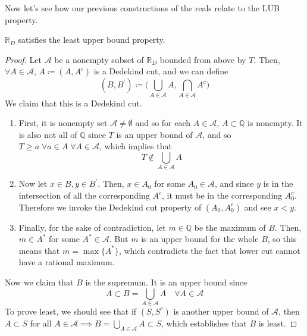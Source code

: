   Now let's see how our previous constructions of the reals relate to the LUB property. 

  \begin{theorem}
    $\mathbb{R}_D$ satisfies the least upper bound property. 
  \end{theorem}
  \begin{proof}
    Let $\mathcal{A}$ be a nonempty subset of $\mathbb{R}_D$ bounded from above by $T$. Then, $\forall A \in \mathcal{A}$, $A \coloneqq (A, A^c)$ is a Dedekind cut, and we can define
    \begin{equation}
      (B, B^\prime) \coloneqq \bigg( \bigcup_{A \in \mathcal{A}} A, \bigcap_{A \in \mathcal{A}} A^c \bigg)
    \end{equation} 
    We claim that this is a Dedekind cut. 
    \begin{enumerate}
      \item First, it is nonempty set $\mathcal{A} \neq \emptyset$ and so for each $A \in \mathcal{A}$, $A \subset \mathbb{Q}$ is nonempty. It is also not all of $\mathbb{Q}$ since $T$ is an upper bound of $\mathcal{A}$, and so $T \geq a \; \forall a \in A \; \forall A \in \mathcal{A}$, which implies that 
      \begin{equation}
        T \not\in \bigcup_{A \in \mathcal{A}} A
      \end{equation}

      \item Now let $x \in B, y \in B^\prime$. Then, $x \in A_0$ for some $A_0 \in \mathcal{A}$, and since $y$ is in the intersection of all the corresponding $A^c$, it must be in the corresponding $A_0^c$. Therefore we invoke the Dedekind cut property of $(A_0, A_0^c)$ and see $x < y$. 

      \item Finally, for the sake of contradiction, let $m \in \mathbb{Q}$ be the maximum of $B$. Then, $m \in A^\ast$ for some $A^\ast \in \mathcal{A}$. But $m$ is an upper bound for the whole $B$, so this means that $m = \max\{A^\ast\}$, which contradicts the fact that lower cut cannot have a rational maximum. 
    \end{enumerate}
    Now we claim that $B$ is the supremum. It is an upper bound since 
    \begin{equation}
      A \subset B = \bigcup_{A \in \mathcal{A}} A \quad \forall A \in \mathcal{A}
    \end{equation}
    To prove least, we should see that if $(S, S^c)$ is another upper bound of $\mathcal{A}$, then $A \subset S$ for all $A \in \mathcal{A} \implies B = \bigcup_{A \in \mathcal{A}} A \subset S$, which establishes that $B$ is least. 
  \end{proof}

